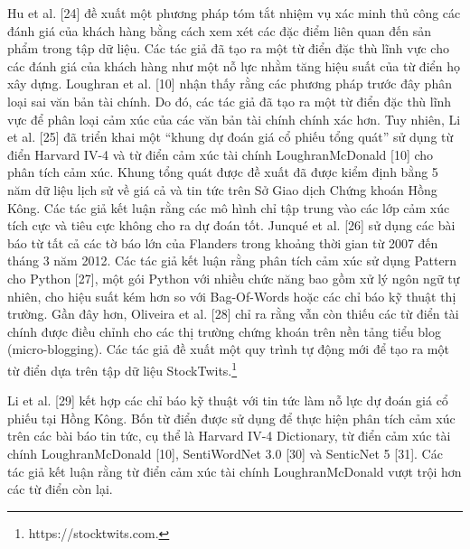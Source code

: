Hu et al. [24] đề xuất một phương pháp tóm tắt nhiệm vụ xác minh thủ công các đánh giá của khách hàng bằng cách xem xét các đặc điểm liên quan đến sản phẩm trong tập dữ liệu. Các tác giả đã tạo ra một từ điển đặc thù lĩnh vực cho các đánh giá của khách hàng như một nỗ lực nhằm tăng hiệu suất của từ điển họ xây dựng. Loughran et al. [10] nhận thấy rằng các phương pháp trước đây phân loại sai văn bản tài chính. Do đó, các tác giả đã tạo ra một từ điển đặc thù lĩnh vực để phân loại cảm xúc của các văn bản tài chính chính xác hơn. Tuy nhiên, Li et al. [25] đã triển khai một ``khung dự đoán giá cổ phiếu tổng quát'' sử dụng từ điển Harvard IV-4 và từ điển cảm xúc tài chính Loughran\textendash McDonald [10] cho phân tích cảm xúc. Khung tổng quát được đề xuất đã được kiểm định bằng 5 năm dữ liệu lịch sử về giá cả và tin tức trên Sở Giao dịch Chứng khoán Hồng Kông. Các tác giả kết luận rằng các mô hình chỉ tập trung vào các lớp cảm xúc tích cực và tiêu cực không cho ra dự đoán tốt. Junqué et al. [26] sử dụng các bài báo từ tất cả các tờ báo lớn của Flanders trong khoảng thời gian từ 2007 đến tháng 3 năm 2012. Các tác giả kết luận rằng phân tích cảm xúc sử dụng Pattern cho Python [27], một gói Python với nhiều chức năng bao gồm xử lý ngôn ngữ tự nhiên, cho hiệu suất kém hơn so với Bag-Of-Words hoặc các chỉ báo kỹ thuật thị trường. Gần đây hơn, Oliveira et al. [28] chỉ ra rằng vẫn còn thiếu các từ điển tài chính được điều chỉnh cho các thị trường chứng khoán trên nền tảng tiểu blog (micro-blogging). Các tác giả đề xuất một quy trình tự động mới để tạo ra một từ điển dựa trên tập dữ liệu StockTwits.\footnote{https://stocktwits.com.}

Li et al. [29] kết hợp các chỉ báo kỹ thuật với tin tức làm nỗ lực dự đoán giá cổ phiếu tại Hồng Kông. Bốn từ điển được sử dụng để thực hiện phân tích cảm xúc trên các bài báo tin tức, cụ thể là Harvard IV-4 Dictionary, từ điển cảm xúc tài chính Loughran\textendash McDonald [10], SentiWordNet 3.0 [30] và SenticNet 5 [31]. Các tác giả kết luận rằng từ điển cảm xúc tài chính Loughran\textendash McDonald vượt trội hơn các từ điển còn lại.

